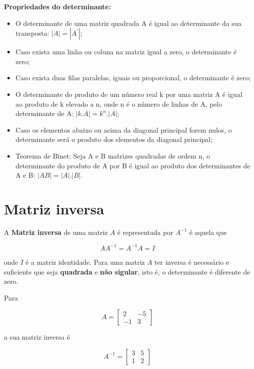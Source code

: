 \documentclass[
]{book}
\providecommand{\tightlist}{%
  \setlength{\itemsep}{0pt}\setlength{\parskip}{0pt}}
\begin{document}
\textbf{Propriedades do determinante:}

\begin{itemize}
\tightlist
\item
  O determinante de uma matriz quadrada A é igual ao determinante da sua transposta: \(|A| = |A^\prime|\);
\item
  Caso exista uma linha ou coluna na matriz igual a zero, o determinante é zero;
\item
  Caso exista duas filas paralelas, iguais ou proporcional, o determinante é zero;
\item
  O determinante do produto de um número real k por uma matriz A é igual ao produto de k elevado a n, onde n é o número de linhas de A, pelo determinante de A: \(|k . A| = k^n . |A|\);
\item
  Caso os elementos abaixo ou acima da diagonal principal forem nulos, o determinante será o produto dos elementos da diagonal principal;
\item
  Teorema de Binet: Seja A e B matrizes quadradas de ordem n, o determinante do produto de A por B é igual ao produto dos determinantes de A e B: \(|AB|=|A|.|B|\).
\end{itemize}

\hypertarget{matriz-inversa}{%
\section{Matriz inversa}\label{matriz-inversa}}

A \textbf{Matriz inversa} de uma matriz \(A\) é representada por \(A^{-1}\) é aquela que

\begin{equation*}
AA^{-1}=A^{-1}A = I
\end{equation*}

onde \(I\) é a matriz identidade. Para uma matriz \(A\) ter inversa é necessário e suficiente que seja \textbf{quadrada} e \textbf{não sigular}, isto é, o determinante é diferente de zero.

Para

\begin{equation*}
A = 
\begin{bmatrix}
 2  & -5\\
-1  &  3
\end{bmatrix}
\end{equation*}

a sua matriz inversa é

\begin{equation*}
A^{-1} = 
\begin{bmatrix}
 3 & 5\\
 1 & 2
\end{bmatrix}
\end{equation*}
\end{document}
